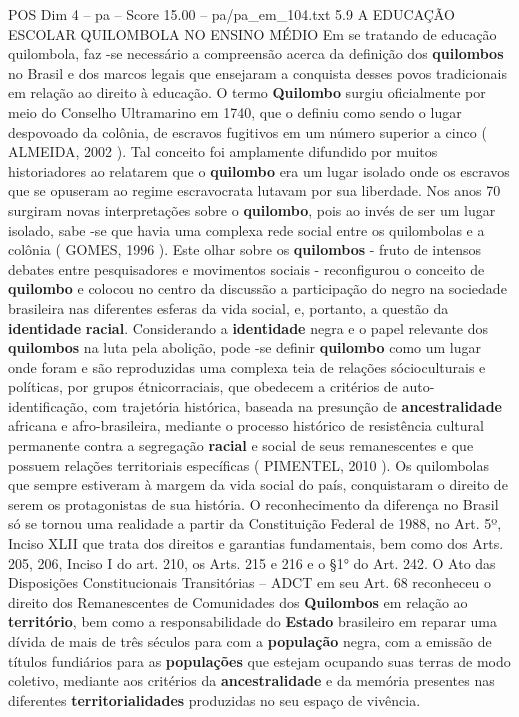 \begin{textsample}{POS Dim 4 – pa – Score 15.00 – pa/pa\_em\_104.txt}  \label{ex:f4_pos_008}
5.9 A EDUCAÇÃO ESCOLAR QUILOMBOLA NO ENSINO MÉDIO Em se tratando de educação quilombola, faz -se necessário a compreensão acerca da definição dos \textbf{quilombos} no Brasil e dos marcos legais que ensejaram a conquista desses povos tradicionais em relação ao direito à educação.
O termo \textbf{Quilombo} surgiu oficialmente por meio do Conselho Ultramarino em 1740, que o definiu como sendo o lugar despovoado da colônia, de escravos fugitivos em um número superior a cinco ( ALMEIDA, 2002 ).
Tal conceito foi amplamente difundido por muitos historiadores ao relatarem que o \textbf{quilombo} era um lugar isolado onde os escravos que se opuseram ao regime escravocrata lutavam por sua liberdade.
Nos anos 70 surgiram novas interpretações sobre o \textbf{quilombo}, pois ao invés de ser um lugar isolado, sabe -se que havia uma complexa rede social entre os quilombolas e a colônia ( GOMES, 1996 ).
Este olhar sobre os \textbf{quilombos} - fruto de intensos debates entre pesquisadores e movimentos sociais - reconfigurou o conceito de \textbf{quilombo} e colocou no centro da discussão a participação do negro na sociedade brasileira nas diferentes esferas da vida social, e, portanto, a questão da \textbf{identidade} \textbf{racial}.
Considerando a \textbf{identidade} negra e o papel relevante dos \textbf{quilombos} na luta pela abolição, pode -se definir \textbf{quilombo} como um lugar onde foram e são reproduzidas uma complexa teia de relações sócioculturais e políticas, por grupos étnicorraciais, que obedecem a critérios de auto-identificação, com trajetória histórica, baseada na presunção de \textbf{ancestralidade} africana e afro-brasileira, mediante o processo histórico de resistência cultural permanente contra a segregação \textbf{racial} e social de seus remanescentes e que possuem relações territoriais específicas ( PIMENTEL, 2010 ).
Os quilombolas que sempre estiveram à margem da vida social do país, conquistaram o direito de serem os protagonistas de sua história.
O reconhecimento da diferença no Brasil só se tornou uma realidade a partir da Constituição Federal de 1988, no Art. 5º, Inciso XLII que trata dos direitos e garantias fundamentais, bem como dos Arts. 205, 206, Inciso I do art. 210, os Arts. 215 e 216 e o §1{\EmojiFont °} do Art. 242.
O Ato das Disposições Constitucionais Transitórias – ADCT em seu Art. 68 reconheceu o direito dos Remanescentes de Comunidades dos \textbf{Quilombos} em relação ao \textbf{território}, bem como a responsabilidade do \textbf{Estado} brasileiro em reparar uma dívida de mais de três séculos para com a \textbf{população} negra, com a emissão de títulos fundiários para as \textbf{populações} que estejam ocupando suas terras de modo coletivo, mediante aos critérios da \textbf{ancestralidade} e da memória presentes nas diferentes \textbf{territorialidades} produzidas no seu espaço de vivência.

\end{textsample}
